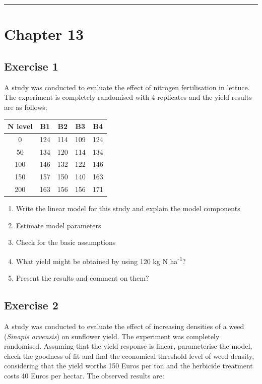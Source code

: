 \documentclass[a4paper,12pt,oneside]{book}
\providecommand{\tightlist}{%
  \setlength{\itemsep}{0pt}\setlength{\parskip}{0pt}}
\begin{document}
\begin{center}\rule{0.5\linewidth}{0.5pt}\end{center}

\hypertarget{chapter-13}{%
\section{Chapter 13}\label{chapter-13}}

\hypertarget{exercise-1-7}{%
\subsection{Exercise 1}\label{exercise-1-7}}

A study was conducted to evaluate the effect of nitrogen fertilisation in lettuce. The experiment is completely randomised with 4 replicates and the yield results are as follows:

\begin{longtable}[]{@{}ccccc@{}}
\toprule
N level & B1 & B2 & B3 & B4 \\
\midrule
\endhead
0 & 124 & 114 & 109 & 124 \\
50 & 134 & 120 & 114 & 134 \\
100 & 146 & 132 & 122 & 146 \\
150 & 157 & 150 & 140 & 163 \\
200 & 163 & 156 & 156 & 171 \\
\bottomrule
\end{longtable}

\begin{enumerate}
\def\labelenumi{\arabic{enumi}.}
\tightlist
\item
  Write the linear model for this study and explain the model components
\item
  Estimate model parameters
\item
  Check for the basic assumptions
\item
  What yield might be obtained by using 120 kg N ha\textsuperscript{-1}?
\item
  Present the results and comment on them?
\end{enumerate}

\hypertarget{exercise-2-7}{%
\subsection{Exercise 2}\label{exercise-2-7}}

A study was conducted to evaluate the effect of increasing densities of a weed (\emph{Sinapis arvensis}) on sunflower yield. The experiment was completely randomised. Assuming that the yield response is linear, parameterise the model, check the goodness of fit and find the economical threshold level of weed density, considering that the yield worths 150 Euros per ton and the herbicide treatment costs 40 Euros per hectar. The observed results are:
\end{document}
